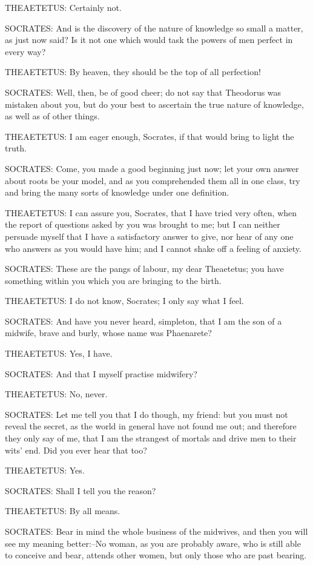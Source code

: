 THEAETETUS: Certainly not.

SOCRATES: And is the discovery of the nature of knowledge so small a
matter, as just now said? Is it not one which would task the powers of
men perfect in every way?

THEAETETUS: By heaven, they should be the top of all perfection!

SOCRATES: Well, then, be of good cheer; do not say that Theodorus was
mistaken about you, but do your best to ascertain the true nature of
knowledge, as well as of other things.

THEAETETUS: I am eager enough, Socrates, if that would bring to light
the truth.

SOCRATES: Come, you made a good beginning just now; let your own answer
about roots be your model, and as you comprehended them all in one
class, try and bring the many sorts of knowledge under one definition.

THEAETETUS: I can assure you, Socrates, that I have tried very often,
when the report of questions asked by you was brought to me; but I can
neither persuade myself that I have a satisfactory answer to give, nor
hear of any one who answers as you would have him; and I cannot shake
off a feeling of anxiety.

SOCRATES: These are the pangs of labour, my dear Theaetetus; you have
something within you which you are bringing to the birth.

THEAETETUS: I do not know, Socrates; I only say what I feel.

SOCRATES: And have you never heard, simpleton, that I am the son of a
midwife, brave and burly, whose name was Phaenarete?

THEAETETUS: Yes, I have.

SOCRATES: And that I myself practise midwifery?

THEAETETUS: No, never.

SOCRATES: Let me tell you that I do though, my friend: but you must not
reveal the secret, as the world in general have not found me out; and
therefore they only say of me, that I am the strangest of mortals and
drive men to their wits' end. Did you ever hear that too?

THEAETETUS: Yes.

SOCRATES: Shall I tell you the reason?

THEAETETUS: By all means.

SOCRATES: Bear in mind the whole business of the midwives, and then you
will see my meaning better:--No woman, as you are probably aware, who is
still able to conceive and bear, attends other women, but only those who
are past bearing.

